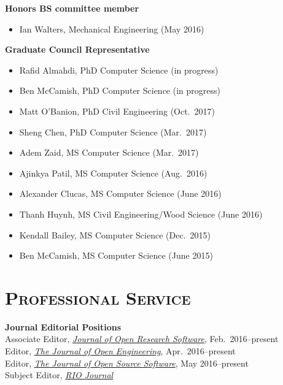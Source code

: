 \documentclass[margin,line,11pt]{res}
\begin{document}
\begin{resume}
\textbf{Honors BS committee member}
\begin{itemize}[leftmargin=*]
    \item Ian Walters, Mechanical Engineering (May 2016)
\end{itemize}

\textbf{Graduate Council Representative}
\begin{itemize}[leftmargin=*]
    \item Rafid Almahdi, PhD Computer Science (in progress)
    \item Ben McCamish, PhD Computer Science (in progress)
    \item Matt O'Banion, PhD Civil Engineering (Oct.~2017)
    \item Sheng Chen, PhD Computer Science (Mar.~2017)
    \item Adem Zaid, MS Computer Science (Mar.~2017)
    \item Ajinkya Patil, MS Computer Science (Aug.~2016)
    \item Alexander Clucas, MS Computer Science (June 2016)
    \item Thanh Huynh, MS Civil Engineering\slash Wood Science (June 2016)
    \item Kendall Bailey, MS Computer Science (Dec.~2015)
    \item Ben McCamish, MS Computer Science (June 2015)
\end{itemize}

\section{\textsc{Professional Service}}

\textbf{Journal Editorial Positions} \\
Associate Editor, \href{http://openresearchsoftware.metajnl.com}{\emph{Journal of Open Research Software}}, Feb.\ 2016--present \\
Editor, \href{http://www.tjoe.org}{\emph{The Journal of Open Engineering}}, Apr.\ 2016--present \\
Editor, \href{http://joss.theoj.org}{\emph{The Journal of Open Source Software}}, May 2016--present \\
Subject Editor, \href{http://riojournal.com}{\emph{RIO Journal}}


\end{resume}
\end{document}
